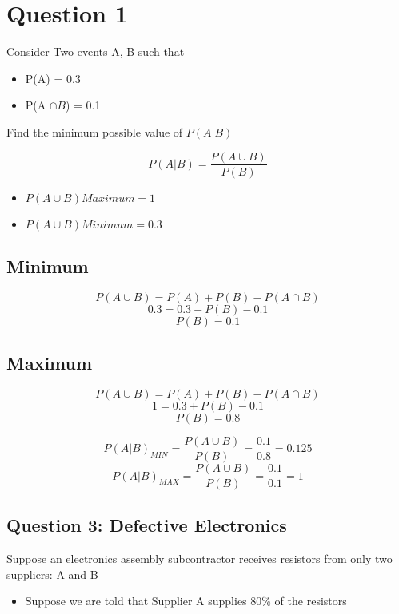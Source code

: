 \documentclass[]{report}
\begin{document}
\section*{Question 1}
Consider Two events A, B such that

\begin{itemize}
\item P(A) = 0.3
\item P(A $\cap B$) = 0.1
\end{itemize}

Find the minimum possible value of $P(A|B)$

\[ P(A|B) = \frac{P(A \cup B) }{P(B)}\]

\begin{itemize}
\item $P(A \cup B) Maximum = 1$
\item $P(A \cup B) Minimum = 0.3$
\end{itemize}

\subsection*{Minimum}

\[ P(A \cup B) = P(A) + P(B) - P(A \cap B)\]
\[ 0.3 = 0.3 + P(B) - 0.1 \]
\[ P(B) = 0.1\] 

\subsection*{Maximum}

\[ P(A \cup B) = P(A) + P(B) - P(A \cap B)\]
\[ 1 = 0.3 + P(B) - 0.1 \]
\[P(B) = 0.8\]

\[ P(A|B)_{MIN} = \frac{P(A \cup B) }{P(B)} = \frac{0.1}{0.8} = 0.125 \]
\[ P(A|B)_{MAX} = \frac{P(A \cup B) }{P(B)} = \frac{0.1}{0.1} = 1 \]


\subsection*{Question 3: Defective Electronics}
Suppose an electronics assembly subcontractor receives resistors from only two suppliers: A and B

\begin{itemize}
\item Suppose we are told that Supplier A supplies 80\% of the resistors

\end{itemize}
\end{document}
